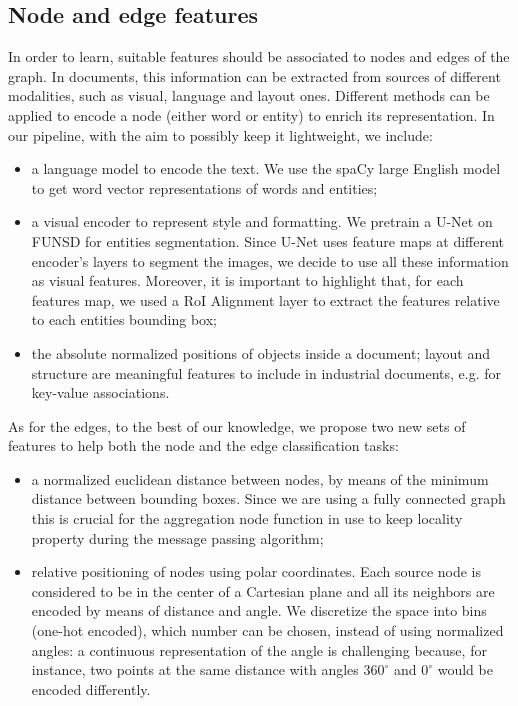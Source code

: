 \documentclass[runningheads]{llncs}
\begin{document}
\subsection{Node and edge features}
\label{sec:features}
In order to learn, suitable features should be associated to nodes and edges of the graph. In documents, this information can be extracted from sources of different modalities, such as visual, language and layout ones.
Different methods can be applied to encode a node (either word or entity) to enrich its representation. In our pipeline, with the aim to possibly keep it lightweight, we include:
\begin{itemize}
    \item a language model to encode the text. We use the spaCy large English model to get word vector representations of words and entities;
    \item a visual encoder to represent style and formatting. We pretrain a U-Net\cite{DBLP:journals/corr/RonnebergerFB15} on FUNSD for entities segmentation. Since U-Net uses feature maps at different encoder's layers to segment the images, we decide to use all these information as visual features. Moreover, it is important to highlight that, for each features map, we used a RoI Alignment layer to extract the features relative to each entities bounding box;
    \item the absolute normalized positions of objects inside a document; layout and structure are meaningful features to include in industrial documents, e.g. for key-value associations.
\end{itemize}
As for the edges, to the best of our knowledge, we propose two new sets of features to help both the node and the edge classification tasks:
\begin{itemize}
    \item a normalized euclidean distance between nodes, by means of the minimum distance between bounding boxes. Since we are using a fully connected graph this is crucial for the aggregation node function in use to keep locality property during the message passing algorithm;
    \item relative positioning of nodes using polar coordinates. Each source node is considered to be in the center of a Cartesian plane and all its neighbors are encoded by means of distance and angle. We discretize the space into bins (one-hot encoded), which number can be chosen, instead of using normalized angles: a continuous representation of the angle is challenging because, for instance, two points at the same distance with angles $360^{\circ}$ and $0^{\circ}$ would be encoded differently.
\end{itemize}
\end{document}
